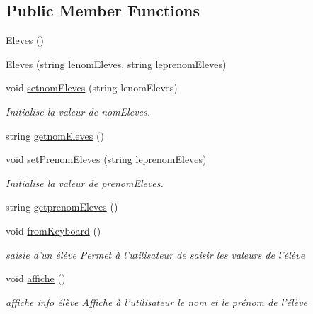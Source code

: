 \subsection*{Public Member Functions}
\begin{DoxyCompactItemize}
\item 
\hyperlink{class_eleves_a1dedbccd0a95ba6af0db2f1d49055f50}{Eleves} ()
\item 
\hyperlink{class_eleves_ad98d50a78df14a3bf88d42e3b0f4d4af}{Eleves} (string lenom\+Eleves, string leprenom\+Eleves)
\item 
void \hyperlink{class_eleves_a9c240aaf34139c8b5a042482827fbe2d}{setnom\+Eleves} (string lenom\+Eleves)
\begin{DoxyCompactList}\small\item\em Initialise la valeur de nom\+Eleves. \end{DoxyCompactList}\item 
string \hyperlink{class_eleves_a00bf5edb75314e55efe8c697fbd5fbcd}{getnom\+Eleves} ()
\item 
void \hyperlink{class_eleves_a97f03e467cadd86e4e46445569559694}{set\+Prenom\+Eleves} (string leprenom\+Eleves)
\begin{DoxyCompactList}\small\item\em Initialise la valeur de prenom\+Eleves. \end{DoxyCompactList}\item 
string \hyperlink{class_eleves_a908388f75621ff9832e9830b31d09c45}{getprenom\+Eleves} ()
\item 
void \hyperlink{class_eleves_ae47e80b391d72d89e4925c15aa74e077}{from\+Keyboard} ()
\begin{DoxyCompactList}\small\item\em saisie d'un élève Permet à l'utilisateur de saisir les valeurs de l'élève \end{DoxyCompactList}\item 
void \hyperlink{class_eleves_a94f519fbb4d38bce24b51baf6f496eb6}{affiche} ()
\begin{DoxyCompactList}\small\item\em affiche info élève Affiche à l'utilisateur le nom et le prénom de l'élève \end{DoxyCompactList}\end{DoxyCompactItemize}



